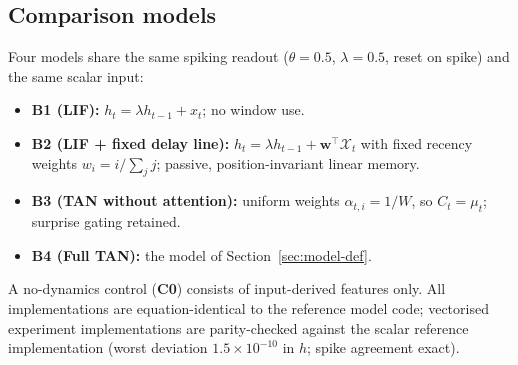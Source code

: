 \subsection{Comparison models}\label{sec:model-compare}

Four models share the same spiking readout ($\theta = 0.5$,
$\lambda = 0.5$, reset on spike) and the same scalar input:
\begin{itemize}
\item \textbf{B1 (LIF):} $h_t = \lambda h_{t-1} + x_t$; no window use.
\item \textbf{B2 (LIF + fixed delay line):} $h_t = \lambda h_{t-1}
  + \mathbf{w}^{\top}\mathcal{X}_t$ with fixed recency weights
  $w_i = i/\sum_j j$; passive, position-invariant linear memory.
\item \textbf{B3 (TAN without attention):} uniform weights
  $\alpha_{t,i} = 1/W$, so $C_t = \mu_t$; surprise gating retained.
\item \textbf{B4 (Full TAN):} the model of
  Section~\ref{sec:model-def}.
\end{itemize}
A no-dynamics control (\textbf{C0}) consists of input-derived features
only.  All implementations are equation-identical to the reference model
code; vectorised experiment implementations are parity-checked against
the scalar reference implementation (worst deviation $1.5\times10^{-10}$
in $h$; spike agreement exact).
